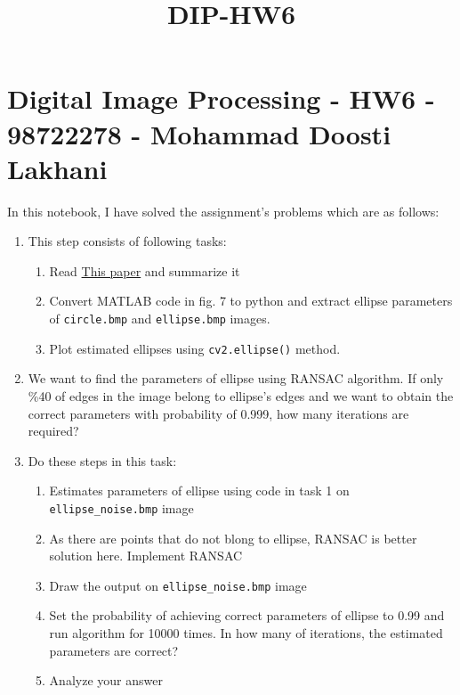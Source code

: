 \documentclass[11pt]{article}
\title{DIP-HW6}
\providecommand{\tightlist}{%
      \setlength{\itemsep}{0pt}\setlength{\parskip}{0pt}}
\begin{document}
    
    
    \maketitle
    
    

    
    \hypertarget{digital-image-processing---hw6---98722278---mohammad-doosti-lakhani}{%
\section{Digital Image Processing - HW6 - 98722278 - Mohammad Doosti
Lakhani}\label{digital-image-processing---hw6---98722278---mohammad-doosti-lakhani}}

In this notebook, I have solved the assignment's problems which are as
follows:

\begin{enumerate}
\def\labelenumi{\arabic{enumi}.}
\tightlist
\item
  This step consists of following tasks:

  \begin{enumerate}
  \def\labelenumii{\arabic{enumii}.}
  \tightlist
  \item
    Read
    \href{http://cseweb.ucsd.edu/~mdailey/Face-Coord/ellipse-specific-fitting.pdf}{This
    paper} and summarize it
  \item
    Convert MATLAB code in fig. 7 to python and extract ellipse
    parameters of \texttt{circle.bmp} and \texttt{ellipse.bmp} images.
  \item
    Plot estimated ellipses using \texttt{cv2.ellipse()} method.
  \end{enumerate}
\item
  We want to find the parameters of ellipse using RANSAC algorithm. If
  only \%40 of edges in the image belong to ellipse's edges and we want
  to obtain the correct parameters with probability of 0.999, how many
  iterations are required?
\item
  Do these steps in this task:

  \begin{enumerate}
  \def\labelenumii{\arabic{enumii}.}
  \tightlist
  \item
    Estimates parameters of ellipse using code in task 1 on
    \texttt{ellipse\_noise.bmp} image
  \item
    As there are points that do not blong to ellipse, RANSAC is better
    solution here. Implement RANSAC
  \item
    Draw the output on \texttt{ellipse\_noise.bmp} image
  \item
    Set the probability of achieving correct parameters of ellipse to
    0.99 and run algorithm for 10000 times. In how many of iterations,
    the estimated parameters are correct?
  \item
    Analyze your answer
  \end{enumerate}
\end{enumerate}
\end{document}
